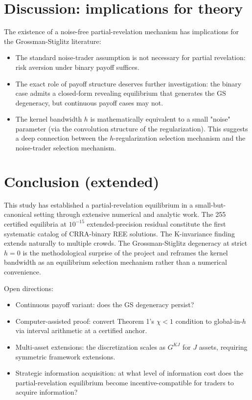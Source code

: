 \documentclass[11pt]{article}
\newcommand{\1}{\mathbf{1}}
\begin{document}
\section{Discussion: implications for theory}

The existence of a noise-free partial-revelation mechanism has
implications for the Grossman-Stiglitz literature:

\begin{itemize}
\item The standard noise-trader assumption is not necessary for
partial revelation: risk aversion under binary payoff suffices.
\item The exact role of payoff structure deserves further investigation:
the binary case admits a closed-form revealing equilibrium that
generates the GS degeneracy, but continuous payoff cases may not.
\item The kernel bandwidth $h$ is mathematically equivalent to a
small "noise" parameter (via the convolution structure of the
regularization).  This suggests a deep connection between the
$h$-regularization selection mechanism and the noise-trader selection
mechanism.
\end{itemize}

\section{Conclusion (extended)}

This study has established a partial-revelation equilibrium in a
small-but-canonical setting through extensive numerical and analytic
work.  The 255 certified equilibria at $10^{-15}$ extended-precision
residual constitute the first systematic catalog of CRRA-binary REE
solutions.  The K-invariance finding extends naturally to multiple
crowds.  The Grossman-Stiglitz degeneracy at strict $h = 0$ is the
methodological surprise of the project and reframes the kernel
bandwidth as an equilibrium selection mechanism rather than a
numerical convenience.

Open directions:
\begin{itemize}
\item Continuous payoff variant: does the GS degeneracy persist?
\item Computer-assisted proof: convert Theorem 1's $\chi < 1$ condition
to global-in-$h$ via interval arithmetic at a certified anchor.
\item Multi-asset extensions: the discretization scales as $G^{KJ}$ for
$J$ assets, requiring symmetric framework extensions.
\item Strategic information acquisition: at what level of information
cost does the partial-revelation equilibrium become incentive-compatible
for traders to acquire information?
\end{itemize}
\end{document}
